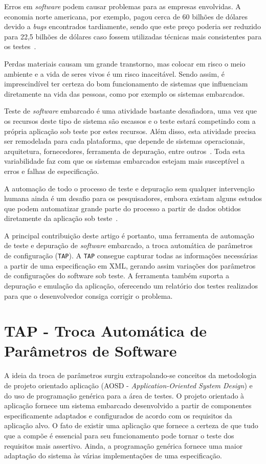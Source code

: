 \documentclass[conference]{IEEEtran}
\begin{document}
Erros em \textit{software} podem causar problemas para as empresas envolvidas. A economia norte americana, por exemplo, pagou cerca de 60 bilhões de dólares devido a \textit{bugs} encontrados tardiamente, sendo que este preço poderia ser reduzido para 22,5 bilhões de dólares caso fossem utilizadas técnicas mais consistentes para os testes~\cite{ tassey2002economic}. 

Perdas materiais causam um grande transtorno, mas colocar em risco o meio ambiente e a vida de seres vivos é um risco inaceitável. Sendo assim, é imprescindível ter certeza do bom funcionamento de sistemas que influenciam diretamente na vida das pessoas, como por exemplo os sistemas embarcados.

Teste de \textit{software} embarcado é uma atividade bastante desafiadora, uma vez que os recursos deste tipo de sistema são escassos e o teste estará competindo com a própria aplicação sob teste por estes recursos. Além disso, esta atividade precisa ser remodelada para cada plataforma, que depende de sistemas operacionais, arquitetura, fornecedores, ferramenta de depuração, entre outros~\cite{schneider2004ten}. Toda esta variabilidade faz com que os sistemas embarcados estejam mais susceptível a erros e falhas de especificação.

A automação de todo o processo de teste e depuração sem qualquer intervenção humana ainda é um desafio para os pesquisadores, embora existam alguns estudos que podem automatizar grande parte do processo a partir de dados obtidos diretamente da aplicação sob teste~\cite{Larson:2013:MDAT,JSWjsw0803603616}.

A principal contribuição deste artigo é portanto, uma ferramenta de automação de teste e depuração de \textit{software} embarcado, a troca automática de parâmetros de configuração (\texttt{TAP}). A \texttt{TAP} consegue capturar todas as informações necessárias a partir de uma especificação em XML, gerando assim variações dos parâmetros de configurações do software sob teste. A ferramenta também suporta a depuração e emulação da aplicação, oferecendo um relatório dos testes realizados para que o desenvolvedor consiga corrigir o problema.

\section{TAP - Troca Automática de Parâmetros de Software}
\label{sec:tap}

A ideia da troca de parâmetros surgiu extrapolando-se conceitos da metodologia de projeto orientado aplicação (AOSD - \textit{Application-Oriented System Design}) e do uso de programação genérica para a área de testes. O projeto orientado à aplicação fornece um sistema embarcado desenvolvido a partir de componentes especificamente adaptados e configurados de acordo com os requisitos da aplicação alvo. O fato de existir uma aplicação que fornece a certeza de que tudo que a compõe é essencial para seu funcionamento pode tornar o teste dos requisitos mais assertivo. Ainda, a programação genérica fornece uma maior adaptação do sistema às várias implementações de uma especificação. 
\end{document}
